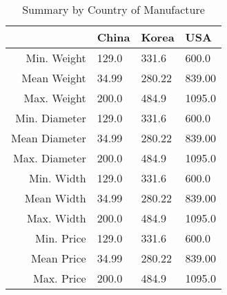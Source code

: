 \begin{table}[ht]
\centering
\begin{tabular}{rlll}
  \hline
 & China & Korea & USA \\ 
  \hline
Min. Weight & 129.0 & 331.6 & 600.0 \\ 
  Mean Weight &  34.99 & 280.22 & 839.00 \\ 
  Max. Weight &  200.0 &  484.9 & 1095.0 \\ 
  Min. Diameter & 129.0 & 331.6 & 600.0 \\ 
  Mean Diameter &  34.99 & 280.22 & 839.00 \\ 
  Max. Diameter &  200.0 &  484.9 & 1095.0 \\ 
  Min. Width & 129.0 & 331.6 & 600.0 \\ 
  Mean Width &  34.99 & 280.22 & 839.00 \\ 
  Max. Width &  200.0 &  484.9 & 1095.0 \\ 
  Min. Price & 129.0 & 331.6 & 600.0 \\ 
  Mean Price &  34.99 & 280.22 & 839.00 \\ 
  Max. Price &  200.0 &  484.9 & 1095.0 \\ 
   \hline
\end{tabular}
\caption{Summary by Country of Manufacture} 
\label{tab:summ_by_country}
\end{table}
